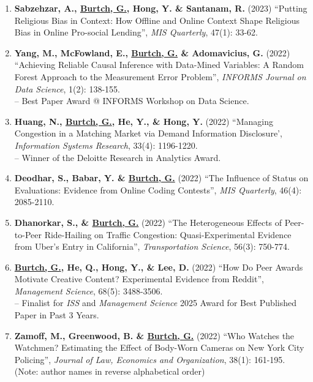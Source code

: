 \documentclass[10.5pt,letterpaper,sans]{moderncv}        %
\begin{document}
\begin{enumerate}[leftmargin=!,labelindent=5pt,itemindent=-15pt]
\item \textbf{Sabzehzar, A., \underline{Burtch, G.}, Hong, Y. \& Santanam, R.} (2023) ``Putting Religious Bias in Context: How Offline and Online Context Shape Religious Bias in Online Pro-social Lending'', \textit{MIS Quarterly}, 47(1): 33-62.

\item \textbf{Yang, M., McFowland, E., \underline{Burtch, G.} \& Adomavicius, G.} (2022) ``Achieving Reliable Causal Inference with Data-Mined Variables: A Random Forest Approach to the Measurement Error Problem'', \textit{INFORMS Journal on Data Science}, 1(2): 138-155.  \\-- Best Paper Award @ INFORMS Workshop on Data Science.

\item \textbf{Huang, N., \underline{Burtch, G.}, He, Y., \& Hong, Y.} (2022) ``Managing Congestion in a Matching Market via Demand Information Disclosure', \textit{Information Systems Research}, 33(4): 1196-1220. \\-- Winner of the Deloitte Research in Analytics Award.

\item \textbf{Deodhar, S., Babar, Y. \& \underline{Burtch, G.}} (2022) ``The Influence of Status on Evaluations: Evidence from Online Coding Contests'', \textit{MIS Quarterly}, 46(4): 2085-2110.

\item \textbf{Dhanorkar, S., \& \underline{Burtch, G.}} (2022) ``The Heterogeneous Effects of Peer-to-Peer Ride-Hailing on Traffic Congestion: Quasi-Experimental Evidence from Uber's Entry in California'', \textit{Transportation Science}, 56(3): 750-774.

\item \textbf{\underline{Burtch, G.}, He, Q., Hong, Y., \& Lee, D.} (2022) ``How Do Peer Awards Motivate Creative Content? Experimental Evidence from Reddit'', \textit{Management Science}, 68(5): 3488-3506. \\-- Finalist for \textit{ISS} and \textit{Management Science} 2025 Award for Best Published Paper in Past 3 Years.

\item \textbf{Zamoff, M., Greenwood, B. \& \underline{Burtch, G.}} (2022) ``Who Watches the Watchmen? Estimating the Effect of Body-Worn Cameras on New York City Policing'', \textit{Journal of Law, Economics and Organization}, 38(1): 161-195. (Note: author names in reverse alphabetical order)


\end{enumerate}
\end{document}
